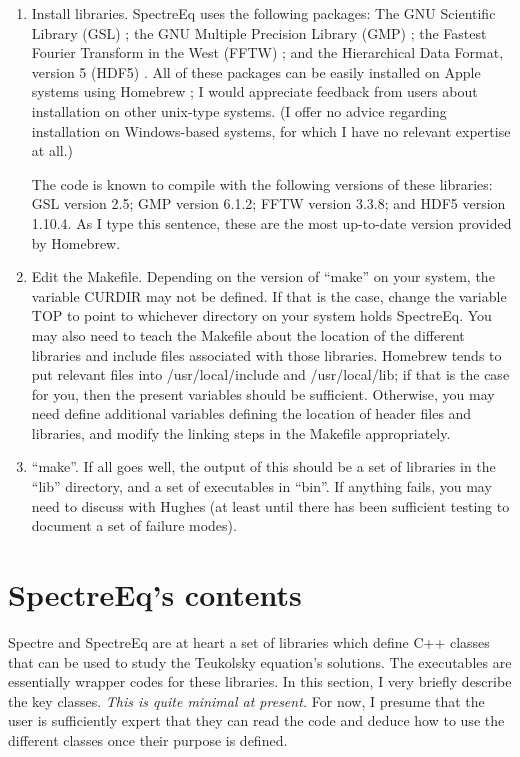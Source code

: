 \documentclass[11pt]{article}
\begin{document}
\begin{enumerate}

\item Install libraries.  SpectreEq uses the following packages: The GNU Scientific Library (GSL) {\cite{gsl}}; the GNU Multiple Precision Library (GMP) {\cite{gmp}}; the Fastest Fourier Transform in the West (FFTW) {\cite{fftw}}; and the Hierarchical Data Format, version 5 (HDF5) {\cite{hdf}}.  All of these packages can be easily installed on Apple systems using Homebrew {\cite{homebrew}}; I would appreciate feedback from users about installation on other unix-type systems.  (I offer no advice regarding installation on Windows-based systems, for which I have no relevant expertise at all.)

The code is known to compile with the following versions of these libraries: GSL version 2.5; GMP version 6.1.2; FFTW version 3.3.8; and HDF5 version 1.10.4.  As I type this sentence, these are the most up-to-date version provided by Homebrew.

\item Edit the Makefile.  Depending on the version of ``make'' on your system, the variable CURDIR may not be defined.  If that is the case, change the variable TOP to point to whichever directory on your system holds SpectreEq.  You may also need to teach the Makefile about the location of the different libraries and include files associated with those libraries.  Homebrew tends to put relevant files into /usr/local/include and /usr/local/lib; if that is the case for you, then the present variables should be sufficient.  Otherwise, you may need define additional variables defining the location of header files and libraries, and modify the linking steps in the Makefile appropriately.

\item ``make''.  If all goes well, the output of this should be a set of libraries in the ``lib'' directory, and a set of executables in ``bin''.  If anything fails, you may need to discuss with Hughes (at least until there has been sufficient testing to document a set of failure modes).

\end{enumerate}

\section{SpectreEq's contents}

Spectre and SpectreEq are at heart a set of libraries which define C++ classes that can be used to study the Teukolsky equation's solutions.  The executables are essentially wrapper codes for these libraries.  In this section, I very briefly describe the key classes.  {\it This is quite minimal at present.}  For now, I presume that the user is sufficiently expert that they can read the code and deduce how to use the different classes once their purpose is defined.
\end{document}
